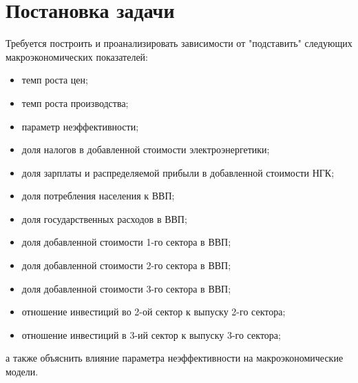 \documentclass[10pt, a4paper]{article}
\begin{document}
\section{Постановка задачи}
Требуется построить и проанализировать зависимости от "подставить" следующих макроэкономических показателей:
\begin{itemize}
\item темп роста цен;
\item темп роста производства;
\item параметр неэффективности;
\item доля налогов в добавленной стоимости электроэнергетики;
\item доля зарплаты и распределяемой прибыли в добавленной стоимости НГК;
\item доля потребления населения к ВВП;
\item доля государственных расходов в ВВП;
\item доля добавленной стоимости 1-го сектора в ВВП;
\item доля добавленной стоимости 2-го сектора в ВВП;
\item доля добавленной стоимости 3-го сектора в ВВП;
\item отношение инвестиций во 2-ой сектор к выпуску 2-го сектора;
\item отношение инвестиций в 3-ий сектор к выпуску 3-го сектора;
\end{itemize}
а также объяснить влияние параметра неэффективности на макроэкономические модели.
\end{document}
